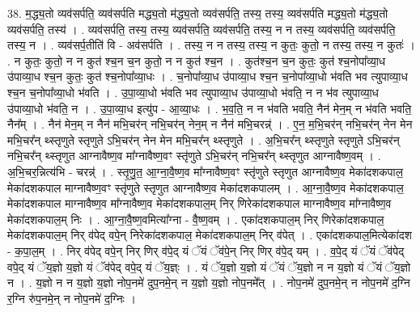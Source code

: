 \documentclass[17pt]{extarticle}
\begin{document}
38. म॒द्ध्य॒तो व्यव॑सर्पति॒ व्यव॑सर्पति मद्ध्य॒तो म॑द्ध्य॒तो व्यव॑सर्पति॒ तस्य॒ तस्य॒ व्यव॑सर्पति मद्ध्य॒तो म॑द्ध्य॒तो व्यव॑सर्पति॒ तस्य॑ । . व्यव॑सर्पति॒ तस्य॒ तस्य॒ व्यव॑सर्पति॒ व्यव॑सर्पति॒ तस्य॒ न न तस्य॒ व्यव॑सर्पति॒ व्यव॑सर्पति॒ तस्य॒ न । . व्यव॑सर्प॒तीति॑ वि - अव॑सर्पति । . तस्य॒ न न तस्य॒ तस्य॒ न कुतः॒ कुतो॒ न तस्य॒ तस्य॒ न कुतः॑ । . न कुतः॒ कुतो॒ न न कुत॑ श्च॒न च॒न कुतो॒ न न कुत॑ श्च॒न । . कुत॑श्च॒न च॒न कुतः॒ कुत॑ श्च॒नोपा᳚व्या॒ध उ॑पाव्या॒ध श्च॒न कुतः॒ कुत॑ श्च॒नोपा᳚व्या॒धः । . च॒नोपा᳚व्या॒ध उ॑पाव्या॒ध श्च॒न च॒नोपा᳚व्या॒धो भ॑वति भव त्युपाव्या॒ध श्च॒न च॒नोपा᳚व्या॒धो भ॑वति । . उ॒पा॒व्या॒धो भ॑वति भव त्युपाव्या॒ध उ॑पाव्या॒धो भ॑वति॒ न न भ॑व त्युपाव्या॒ध उ॑पाव्या॒धो भ॑वति॒ न । . उ॒पा॒व्या॒ध इत्यु॑प - आ॒व्या॒धः । . भ॒व॒ति॒ न न भ॑वति भवति॒ नैन॑ मेन॒म् न भ॑वति भवति॒ नैन᳚म् । . नैन॑ मेन॒म् न नैन॑ मभि॒चर॑न् नभि॒चर॑न् नेन॒म् न नैन॑ मभि॒चरन्न्॑ । . ए॒न॒ म॒भि॒चर॑न् नभि॒चर॑न् नेन मेन मभि॒चर᳚न् थ्स्तृणुते स्तृणुते ऽभि॒चर॑न् नेन मेन मभि॒चर᳚न् थ्स्तृणुते । . अ॒भि॒चर᳚न् थ्स्तृणुते स्तृणुते ऽभि॒चर॑न् नभि॒चर᳚न् थ्स्तृणुत आग्नावैष्ण॒व मा᳚ग्नावैष्ण॒वꣳ स्तृ॑णुते 
ऽभि॒चर॑न् नभि॒चर᳚न् थ्स्तृणुत आग्नावैष्ण॒वम् । . अ॒भि॒चर॒न्नित्य॑भि - चरन्न्॑ । . स्तृ॒णु॒त॒ आ॒ग्ना॒वै॒ष्ण॒व मा᳚ग्नावैष्ण॒वꣳ स्तृ॑णुते स्तृणुत आग्नावैष्ण॒व मेका॑दशकपाल॒ मेका॑दशकपाल माग्नावैष्ण॒वꣳ स्तृ॑णुते स्तृणुत आग्नावैष्ण॒व मेका॑दशकपालम् । . आ॒ग्ना॒वै॒ष्ण॒व मेका॑दशकपाल॒ मेका॑दशकपाल माग्नावैष्ण॒व मा᳚ग्नावैष्ण॒व मेका॑दशकपाल॒म् निर् णिरेका॑दशकपाल माग्नावैष्ण॒व मा᳚ग्नावैष्ण॒व मेका॑दशकपाल॒म् निः । . आ॒ग्ना॒वै॒ष्ण॒वमित्या᳚ग्ना - वै॒ष्ण॒वम् । . एका॑दशकपाल॒म् निर् णिरेका॑दशकपाल॒ मेका॑दशकपाल॒म् निर् व॑पेद् वपे॒न् निरेका॑दशकपाल॒ मेका॑दशकपाल॒म् निर् व॑पेत् । . एका॑दशकपाल॒मित्येका॑दश - क॒पा॒ल॒म् । . निर् व॑पेद् वपे॒न् निर् णिर् व॑पे॒द् यं ॅयं ॅव॑पे॒न् निर् णिर् व॑पे॒द् यम् । . व॒पे॒द् यं ॅयं ॅव॑पेद् वपे॒द् यं ॅय॒ज्ञो य॒ज्ञो यं ॅव॑पेद् वपे॒द् यं ॅय॒ज्ञ्ः । . यं ॅय॒ज्ञो य॒ज्ञो यं ॅयं ॅय॒ज्ञो न न य॒ज्ञो यं ॅयं ॅय॒ज्ञो न । . य॒ज्ञो न न य॒ज्ञो य॒ज्ञो नोप॒नमे॑ दुप॒नमे॒न् न य॒ज्ञो य॒ज्ञो नोप॒नमे᳚त् । . नोप॒नमे॑ दुप॒नमे॒न् न नोप॒नमे॑ द॒ग्नि र॒ग्नि रु॑प॒नमे॒न् न नोप॒नमे॑ द॒ग्निः । \newline
\pagebreak
{}
\end{document}
